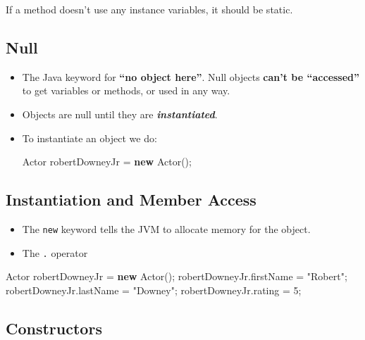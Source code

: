 \documentclass[]{article}
\newenvironment{Shaded}{}{}
\newcommand{\DecValTok}[1]{\textcolor[rgb]{0.25,0.63,0.44}{#1}}
\newcommand{\FunctionTok}[1]{\textcolor[rgb]{0.02,0.16,0.49}{#1}}
\newcommand{\KeywordTok}[1]{\textcolor[rgb]{0.00,0.44,0.13}{\textbf{#1}}}
\newcommand{\NormalTok}[1]{#1}
\newcommand{\StringTok}[1]{\textcolor[rgb]{0.25,0.44,0.63}{#1}}
\begin{document}
If a method doesn't use any instance variables, it should be static.

\hypertarget{null}{%
\subsection{Null}\label{null}}

\begin{itemize}
\item
  The Java keyword for \textbf{``no object here''}. Null objects
  \textbf{can't be ``accessed''} to get variables or methods, or used in
  any way.
\item
  Objects are null until they are \textbf{\emph{instantiated}}.
\item
  To instantiate an object we do:

\begin{Shaded}
\begin{Highlighting}[]
\NormalTok{Actor robertDowneyJr = }\KeywordTok{new} \FunctionTok{Actor}\NormalTok{();}
\end{Highlighting}
\end{Shaded}
\end{itemize}

\hypertarget{instantiation-and-member-access}{%
\subsection{Instantiation and Member
Access}\label{instantiation-and-member-access}}

\begin{itemize}
\item
  The \texttt{new} keyword tells the JVM to allocate memory for the
  object.
\item
  The \texttt{.} operator
\end{itemize}

\begin{Shaded}
\begin{Highlighting}[]
\NormalTok{Actor robertDowneyJr = }\KeywordTok{new} \FunctionTok{Actor}\NormalTok{();}
\NormalTok{robertDowneyJr.}\FunctionTok{firstName}\NormalTok{ = }\StringTok{"Robert"}\NormalTok{;}
\NormalTok{robertDowneyJr.}\FunctionTok{lastName}\NormalTok{ = }\StringTok{"Downey"}\NormalTok{;}
\NormalTok{robertDowneyJr.}\FunctionTok{rating}\NormalTok{ = }\DecValTok{5}\NormalTok{;}
\end{Highlighting}
\end{Shaded}

\hypertarget{constructors}{%
\subsection{Constructors}\label{constructors}}
\end{document}

